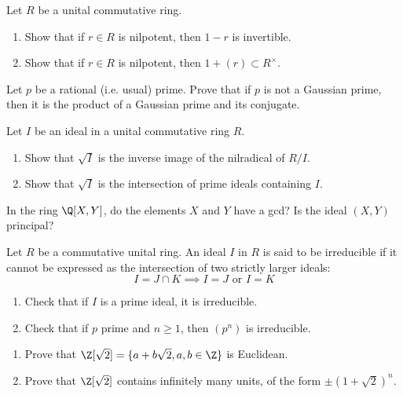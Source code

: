 \begin{problem}
Let \(R\) be a unital commutative ring.
\begin{enumerate}[1]
\item
Show that if \( r \in R \) is nilpotent, then \( 1 - r \) is invertible.
\item
Show that if \( r \in R \) is nilpotent, then \( 1 + (r) \subset R^\times \).
\end{enumerate}
\end{problem}

\begin{problem}
Let \( p \) be a rational (i.e. usual) prime. Prove that if \( p \) is not a Gaussian prime, then it is the product of a Gaussian prime and its conjugate.
\end{problem}

\begin{problem}
Let \( I \) be an ideal in a unital commutative ring \( R \).
\begin{enumerate}[1]
\item
Show that \( \sqrt{I} \) is the inverse image of the nilradical of \( R/I \).
\item
Show that \( \sqrt{I} \) is the intersection of prime ideals containing  \( I \).
\end{enumerate}
\end{problem}

\begin{problem}
In the ring \( \Q[X, Y] \), do the elements \( X \) and \( Y \) have a gcd? Is the ideal \( (X, Y) \) principal?
\end{problem}

\begin{problem}
Let \( R \) be a commutative unital ring. An ideal \( I \) in \( R \) is said to be irreducible if it cannot be expressed as the intersection of two strictly larger ideals:
\[ I = J \cap K \implies I = J \text{ or } I = K \]
\begin{enumerate}[1]
\item
Check that if \( I \) is a prime ideal, it is irreducible.
\item
Check that if \( p \) prime and \( n \geq 1 \), then \( (p^n) \) is irreducible.
\end{enumerate}
\end{problem}

\begin{problem}
\begin{enumerate}[1]
\item
Prove that \( \Z[\sqrt{2}] = \{a + b \sqrt{2} , a, b \in \Z \} \) is Euclidean.
\item
Prove that  \( \Z[\sqrt{2}] \) contains infinitely many units, of the form  \( \pm(1 + \sqrt{2})^n \).
\end{enumerate}
\end{problem}

